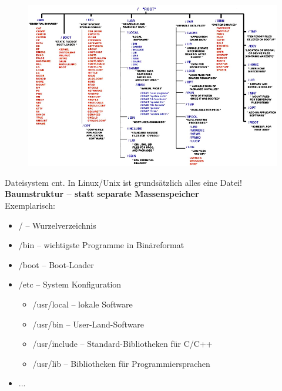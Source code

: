 \documentclass[xcolor=dvipsnames,aspectratio=169]{beamer}
\begin{document}
\begin{frame}
\begin{figure}
  \vspace*{-0.17cm}
\includegraphics[scale=0.4]{filesystem}
\end{figure}
\end{frame}

\begin{frame}{Dateisystem cnt.}
\vspace{-.5cm}
In Linux/Unix ist grundsätzlich alles eine Datei!\\
\textbf{Baumstruktur -- statt separate Massenspeicher}\\
Exemplarisch:
\begin{itemize}
	\item / -- Wurzelverzeichnis
	\item /bin -- wichtigste Programme in Binäreformat
	\item /boot -- Boot-Loader
	\item /etc -- System Konfiguration
	\begin{itemize}
		\item /usr/local -- lokale Software
		\item /usr/bin -- User-Land-Software
		\item /usr/include -- Standard-Bibliotheken für C/C++
		\item /usr/lib -- Bibliotheken für Programmiersprachen
	\end{itemize}
	\item ...
\end{itemize}
\end{frame}
\end{document}
